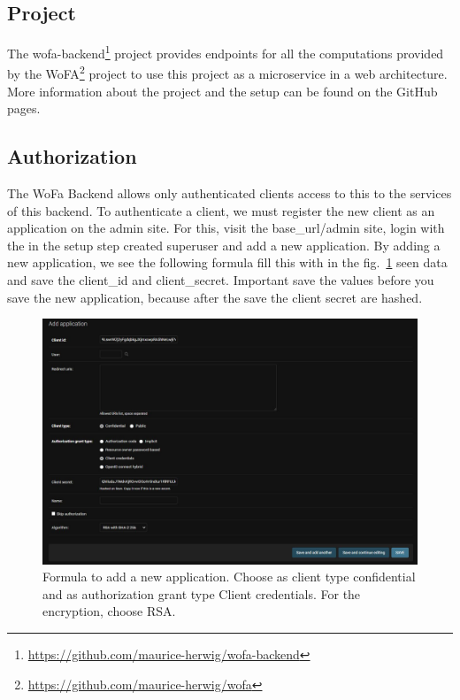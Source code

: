 \subsection{Project}
The wofa-backend\footnote{\url{https://github.com/maurice-herwig/wofa-backend}} project provides endpoints for all the computations provided by the WoFA\footnote{\url{https://github.com/maurice-herwig/wofa}} project to use this project as a microservice in a web architecture. More information about the project and the setup can be found on the GitHub pages. 

\subsection{Authorization}
The WoFa Backend allows only authenticated clients access to this to the services of this backend. To authenticate a client, we must register the new client as an application on the admin site. For this, visit the base\_url/admin site, login with the in the setup step created superuser and add a new application. By adding a new application, we see the following formula fill this with in the fig.~\ref{fig:add_application} seen data and save the client\_id and client\_secret. Important save the values before you save the new application, because after the save the client secret are hashed. 

\begin{figure}
    \centering
    \includegraphics{pictures/register_application.jpg}
    \caption{Formula to add a new application. Choose as client type confidential and as authorization grant type Client credentials. For the encryption, choose RSA. } 
    \label{fig:add_application}
\end{figure}


